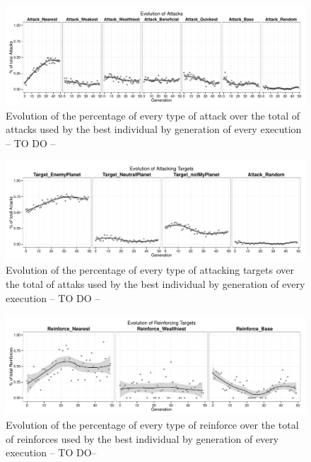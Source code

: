 \documentclass[preprint]{elsarticle}
\begin{document}
 \begin{figure}[ht]
 \begin{center}
   \includegraphics[width=12cm]{nuevas_imgs/estudio_ATTACKS.pdf}
 \end{center}
 \caption{Evolution of the percentage of every type of attack over the total of attacks used by the best individual by generation of every execution -- TO DO -- %
 }
 \label{figura:e_attacks}
 \end{figure}

  \begin{figure}[ht]
 \begin{center}
   \includegraphics[width=12cm]{nuevas_imgs/estudio_TARGETS.pdf}
 \end{center}
 \caption{Evolution of the percentage of every type of attacking targets over the total of attaks used by the best individual by generation of every execution -- TO DO -- %
 }
 \label{figura:e_targets}
 \end{figure}


   \begin{figure}[ht]
 \begin{center}
   \includegraphics[width=12cm]{nuevas_imgs/estudio_TARGETS_REINFORCE.pdf}
 \end{center}
 \caption{Evolution of the percentage of every type of reinforce over the total of reinforces used by the best individual by generation of every execution -- TO DO--}
 \label{figura:e_targetsReinforce}
 \end{figure}
\end{document}

